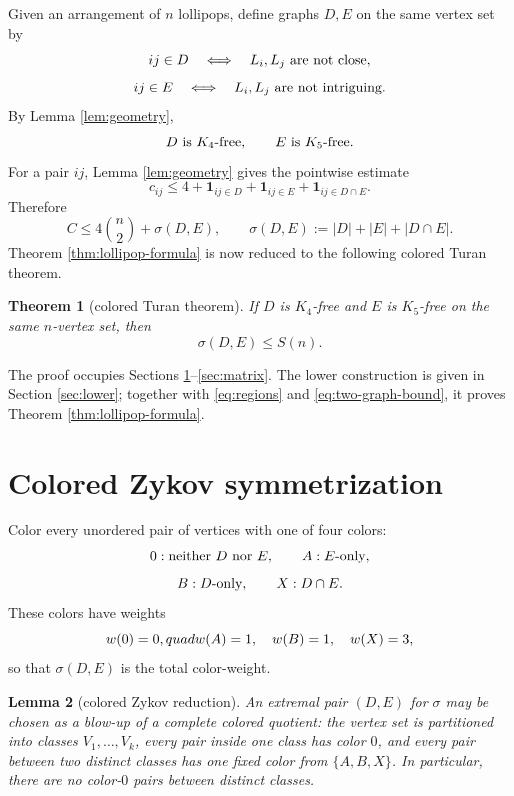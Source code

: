 \documentclass[12pt]{article}
\theoremstyle{plain}
\newtheorem{theorem}{Theorem}
\newtheorem{lemma}[theorem]{Lemma}
\theoremstyle{definition}
\theoremstyle{remark}
\begin{document}
Given an arrangement of \(n\) lollipops, define graphs \(D,E\) on the same
vertex set by
\[
  ij\in D\quad\Longleftrightarrow\quad L_i,L_j\hbox{ are not close},
\]
\[
  ij\in E\quad\Longleftrightarrow\quad L_i,L_j\hbox{ are not intriguing}.
\]
By Lemma \ref{lem:geometry},
\begin{equation}\label{eq:forbidden-DE}
  D\hbox{ is }K_4\hbox{-free},\qquad E\hbox{ is }K_5\hbox{-free}.
\end{equation}
For a pair \(ij\), Lemma \ref{lem:geometry} gives the pointwise estimate
\begin{equation}\label{eq:pair-weight}
  c_{ij}\le
  4+\mathbf 1_{ij\in D}+\mathbf 1_{ij\in E}+\mathbf 1_{ij\in D\cap E}.
\end{equation}
Therefore
\begin{equation}\label{eq:two-graph-bound}
  C\le 4\binom n2+\sigma(D,E),
  \qquad
  \sigma(D,E):=|D|+|E|+|D\cap E|.
\end{equation}
Theorem \ref{thm:lollipop-formula} is now reduced to the following colored
Turan theorem.

\begin{theorem}[colored Turan theorem]\label{thm:colored-turan}
If \(D\) is \(K_4\)-free and \(E\) is \(K_5\)-free on the same \(n\)-vertex
set, then
\begin{equation}\label{eq:sigma-upper}
  \sigma(D,E)\le S(n).
\end{equation}
\end{theorem}

The proof occupies Sections \ref{sec:zykov}--\ref{sec:matrix}.  The lower
construction is given in Section \ref{sec:lower}; together with
\eqref{eq:regions} and \eqref{eq:two-graph-bound}, it proves Theorem
\ref{thm:lollipop-formula}.

\section{Colored Zykov symmetrization}\label{sec:zykov}

Color every unordered pair of vertices with one of four colors:
\[
  0: \hbox{neither }D\hbox{ nor }E,
  \qquad
  A: E\hbox{-only},
\]
\[
  B: D\hbox{-only},
  \qquad
  X: D\cap E.
\]
These colors have weights
\[
  w(0)=0,\\quad w(A)=1,
  \quad w(B)=1,
  \quad w(X)=3,
\]
so that \(\sigma(D,E)\) is the total color-weight.

\begin{lemma}[colored Zykov reduction]\label{lem:zykov}
An extremal pair \((D,E)\) for \(\sigma\) may be chosen as a blow-up of a
complete colored quotient: the vertex set is partitioned into classes
\(V_1,\ldots,V_k\), every pair inside one class has color \(0\), and every pair
between two distinct classes has one fixed color from \(\{A,B,X\}\).  In
particular, there are no color-\(0\) pairs between distinct classes.
\end{lemma}
\end{document}
